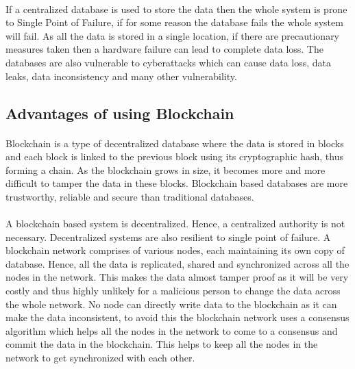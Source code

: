\documentclass{article}
\begin{document}
        \paragraph{}
        If a centralized database is used to store the data then the whole system is prone to Single Point of Failure, if for some reason the database fails the whole system will fail. As all the data is stored in a single location, if there are precautionary measures taken then a hardware failure can lead to complete data loss. The databases are also vulnerable to cyberattacks which can cause data loss, data leaks, data inconsistency and many other vulnerability.
        
    \subsection{Advantages of using Blockchain}
        \paragraph{}
        Blockchain is a type of decentralized database where the data is stored in blocks and each block is linked to the previous block using its cryptographic hash, thus forming a chain. As the blockchain grows in size, it becomes more and more difficult to tamper the data in these blocks. Blockchain based databases are more trustworthy, reliable and secure than traditional databases.
        
        \paragraph{}
        A blockchain based system is decentralized. Hence, a centralized authority is not necessary. Decentralized systems are also resilient to single point of failure. A blockchain network comprises of various nodes, each maintaining its own copy of database. Hence, all the data is replicated, shared and synchronized across all the nodes in the network. This makes the data almost tamper proof as it will be very costly and thus highly unlikely for a malicious person to change the data across the whole network. No node can directly write data to the blockchain as it can make the data inconsistent, to avoid this the blockchain network uses a consensus algorithm which helps all the nodes in the network to come to a consensus and commit the data in the blockchain. This helps to keep all the nodes in the network to get synchronized with each other. 
\end{document}
